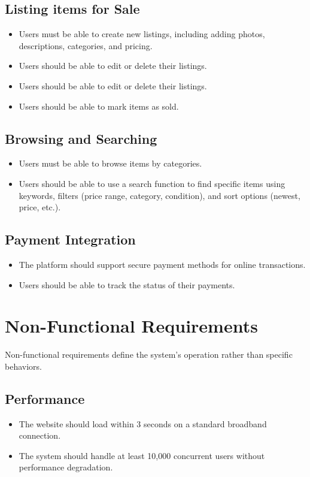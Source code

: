 \subsection{Listing items for Sale}
\begin{itemize}
        \item Users must be able to create new listings, including adding photos, descriptions, categories, and pricing.
    
        \item Users should be able to edit or delete their listings.
        \item Users should be able to edit or delete their listings.
        \item Users should be able to mark items as sold.
\end{itemize}

\subsection{Browsing and Searching}
\begin{itemize}
        \item Users must be able to browse items by categories.
        \item Users should be able to use a search function to find specific items using keywords, filters (price range, category, condition), and sort options (newest, price, etc.).
\end{itemize}

\subsection{Payment Integration}
\begin{itemize}
        \item The platform should support secure payment methods for online transactions.
        \item Users should be able to track the status of their payments.
\end{itemize}

\section{Non-Functional Requirements}
Non-functional requirements define the system's operation rather than specific behaviors.
\subsection{Performance}
\begin{itemize}
        \item The website should load within 3 seconds on a standard broadband connection.
        \item The system should handle at least 10,000 concurrent users without performance degradation.
\end{itemize}

